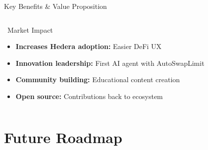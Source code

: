 \documentclass[aspectratio=169]{beamer}
\begin{document}
\begin{frame}{Key Benefits \& Value Proposition}
\begin{columns}
\begin{block}{\faGlobe\ Market Impact}
\begin{itemize}
\setlength\itemsep{-0.1em}
\item[\color{secondary}\faArrowUp] \textbf{Increases Hedera adoption:} Easier DeFi UX
\item[\color{secondary}\faLightbulb] \textbf{Innovation leadership:} First AI agent with AutoSwapLimit
\item[\color{secondary}\faHandshake] \textbf{Community building:} Educational content creation
\item[\color{secondary}\faCode] \textbf{Open source:} Contributions back to ecosystem
\end{itemize}
\end{block}
\end{columns}
\end{frame}

\section{Future Roadmap}
\end{document}
